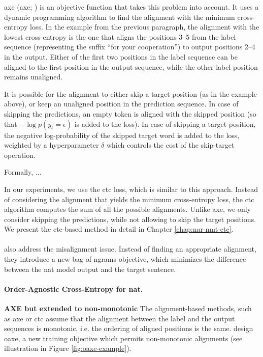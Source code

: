 \Acl{axe}  (\acs{axe}; \citealp{ghazvininejad2020aligned}) is an
objective function that takes this problem into account. It uses a dynamic
programming algorithm to find the alignment with the minimum cross-entropy
loss. In the example from the previous paragraph, the alignment with the lowest
cross-entropy is the one that aligns the positions 3--5 from the label sequence
(representing the suffix ``for your cooperation'') to output positions 2--4 in
the output. Either of the first two positions in the label sequence can be
aligned to the first position in the output sequence, while the other label
position remains unaligned.

It is possible for the alignment to either skip a target position (as in the
example above), or keep an unaligned position in the prediction sequence. In
case of skipping the predictions, an empty token is aligned with the skipped
position (so that $-\log p(y_t = \epsilon)$ is added to the loss). In case of
skipping a target position, the negative log-probability of the skipped target
word is added to the loss, weighted by a hyperparameter $\delta$ which controls
the cost of the skip-target operation.

Formally, ... 

In our experiments, we use the \ac{ctc} loss, which is similar to this
approach. Instead of considering the alignment that yields the minimum
cross-entropy loss, the \ac{ctc} algorithm computes the sum of all the possible
alignments. Unlike \ac{axe}, we only consider skipping the predictions, while
not allowing to skip the target positions. We present the \ac{ctc}-based method
in detail in Chapter \ref{chap:nar-nmt-ctc}.


\paragraph{} \citet{shao2020minimizing} also address the
misalignment issue. Instead of finding an appropriate alignment, they introduce
a new bag-of-ngrams objective, which minimizes the difference between the
\ac{nat} model output and the target sentence. 

\paragraph{Order-Agnostic Cross-Entropy for \acs{nat}.} \textbf{AXE but
  extended to non-monotonic} The alignment-based methods, such as \ac{axe} or
\ac{ctc} assume that the alignment between the label and the output sequences
is monotonic, i.e. the ordering of aligned positions is the
same. \citet{du2021orderagnostic} design \ac{oaxe}, a new training objective
which permits non-monotonic alignments (see illustration in Figure
\ref{fig:oaxe-example}).  

